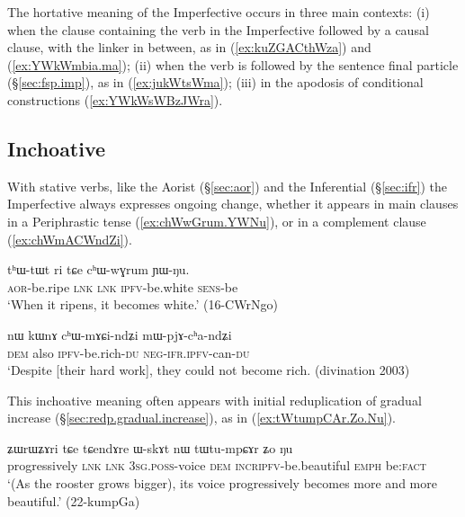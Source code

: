 The hortative meaning of the Imperfective occurs in three main contexts: (i) when the clause containing the verb in the Imperfective followed by a causal clause, with the linker  in between, as in (\ref{ex:kuZGACthWza}) and (\ref{ex:YWkWmbia.ma}); (ii) when the verb is followed by the sentence final particle  (§\ref{sec:fsp.imp}), as in (\ref{ex:jukWtsWma}); (iii) in the apodosis of conditional constructions (\ref{ex:YWkWsWBzJWra}).

\subsection{Inchoative} \label{sec:ipfv.inchoative}
With stative verbs, like the Aorist (§\ref{sec:aor}) and the Inferential (§\ref{sec:ifr}) the Imperfective always expresses ongoing change, whether it appears in main clauses in a Periphrastic tense (\ref{ex:chWwGrum.YWNu}), or in a complement clause (\ref{ex:chWmACWndZi}).

\begin{exe}
\ex \label{ex:chWwGrum.YWNu}
\gll tʰɯ-tɯt ri tɕe cʰɯ-wɣrum ɲɯ-ŋu. \\
\textsc{aor}-be.ripe \textsc{lnk} \textsc{lnk} \textsc{ipfv}-be.white \textsc{sens}-be \\
\glt `When it ripens, it becomes white.' (16-CWrNgo)
\end{exe}

\begin{exe}
\ex \label{ex:chWmACWndZi}
\gll  nɯ kɯnɤ cʰɯ-mɤɕi-ndʑi mɯ-pjɤ-cʰa-ndʑi \\
\textsc{dem} also \textsc{ipfv}-be.rich-\textsc{du} \textsc{neg}-\textsc{ifr}.\textsc{ipfv}-can-\textsc{du} \\
\glt `Despite [their hard work], they could not become rich. (divination 2003)
\end{exe}

This inchoative meaning often appears with initial reduplication of gradual increase (§\ref{sec:redp.gradual.increase}), as in (\ref{ex:tWtumpCAr.Zo.Nu}).

\begin{exe}
\ex \label{ex:tWtumpCAr.Zo.Nu}
\gll ʑɯrɯʑɤri tɕe tɕendɤre ɯ-skɤt nɯ tɯ\redp{}tu-mpɕɤr ʑo ŋu  \\
progressively \textsc{lnk} \textsc{lnk} \textsc{3sg}.\textsc{poss}-voice \textsc{dem} \textsc{incr}\redp{}\textsc{ipfv}-be.beautiful \textsc{emph} be:\textsc{fact} \\
\glt `(As the rooster grows bigger), its voice progressively becomes more and more beautiful.' (22-kumpGa)
\end{exe}

